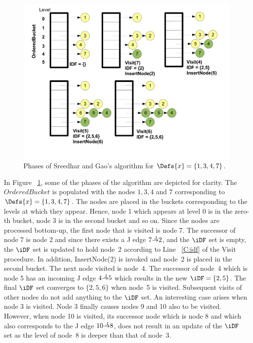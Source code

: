 {    \begin{figure}[htb]
    \centerline{\includegraphics[scale=0.3]{sreedhargao.pdf}}
    \caption{Phases of Sreedhar and Gao's algorithm for $\Defs{x}=\{1,3,4,7\}$.}
    \label{fig:sreedhargao}
    \end{figure} 

In Figure ~\ref{fig:sreedhargao}, some of the phases of the algorithm are depicted for clarity. The $OrderedBucket$
is populated with the nodes $1,3,4$ and $7$ corresponding to $\Defs{x}=\{1,3,4,7\}$. The nodes are
placed in the buckets corresponding to the levels at which they appear. Hence, node 1 which appears at 
level 0 is in the zero-th bucket, node 3 is in the second bucket and so on. Since the
nodes are processed bottom-up, the first node that is visited is node 7. The successor of node 7 is node
2 and since there exists a J edge $7 \st{J} 2$, and the $\iDF$ set is empty, the $\iDF$ set is updated
to hold node~2 according to Line ~\ref{C:idf} of the Visit procedure. In addition, InsertNode(2) is invoked and 
node~2 is placed in the second bucket. The next node visited is node~4. The successor of node~4 which is node
5 has an incoming J edge $4 \st{J} 5$ which results in the new $\iDF = \{2,5\}$. The final $\iDF$ set converges
to $\{2,5,6\}$ when node~5 is visited. Subsequent visits of other nodes do not add anything to the
$\iDF$ set. An interesting case arises when node 3 is visited. Node 3 finally causes nodes 9 and 10 also 
to be visited. However, when node 10 is visited, its successor node which is node 8 and which also 
corresponds to the J edge $10 \st{J} 8$, does not result in an update of the $\iDF$ set as the level of
node~8 is deeper than that of node~3.


}
